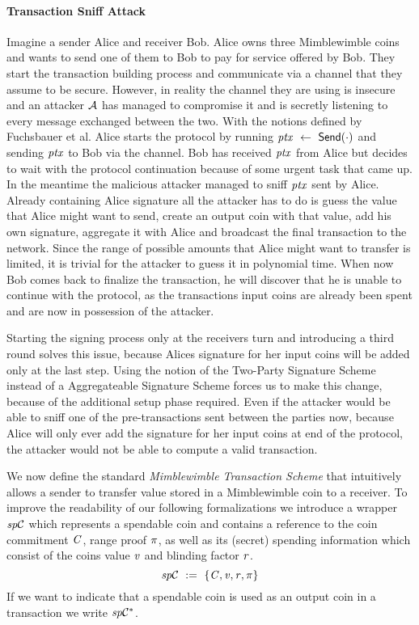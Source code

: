 \paragraph{Transaction Sniff Attack}
Imagine a sender Alice and receiver Bob.
Alice owns three Mimblewimble coins and wants to send one of them to Bob to pay for service offered by Bob.
They start the transaction building process and communicate via a channel that they assume to be secure.
However, in reality the channel they are using is insecure and an attacker $\mathcal{A}$ has managed to compromise it and is secretly listening to every message exchanged between the two.
With the notions defined by Fuchsbauer et al. Alice starts the protocol by running $\mathit{ptx} ~\leftarrow~ \mathsf{Send}(\cdot)$ and sending $\mathit{ptx}$ to Bob via the channel.
Bob has received $\mathit{ptx}$ from Alice but decides to wait with the protocol continuation because of some urgent task that came up.
In the meantime the malicious attacker managed to sniff $\mathit{ptx}$ sent by Alice.
Already containing Alice signature all the attacker has to do is guess the value that Alice might want to send, create an output coin with that value, add his own signature, aggregate it with Alice and broadcast the final transaction to the network.
Since the range of possible amounts that Alice might want to transfer is limited, it is trivial for the attacker to guess it in polynomial time.
When now Bob comes back to finalize the transaction, he will discover that he is unable to continue with the protocol, as the transactions input coins are already been spent and are now in possession of the attacker.

Starting the signing process only at the receivers turn and introducing a third round solves this issue, because Alices signature for her input coins will be added only at the last step.
Using the notion of the Two-Party Signature Scheme instead of a Aggregateable Signature Scheme forces us to make this change, because of the additional setup phase required.
Even if the attacker would be able to sniff one of the pre-transactions sent between the parties now, because Alice will only ever add the signature for her input coins at end of the protocol, the attacker would not be able to compute a valid transaction.

We now define the standard \emph{Mimblewimble Transaction Scheme} that intuitively allows a sender to transfer value stored in a Mimblewimble coin to a receiver.
To improve the readability of our following formalizations we introduce a wrapper $\mathit{sp}\mathcal{C}$ which represents a spendable coin and contains a reference to the coin commitment $\mathit{C}$, range proof $\pi$, as well as its (secret) spending information which consist of the coins value $\mathit{v}$ and blinding factor $\mathit{r}$.
\[ \mathit{sp}\mathcal{C} ~:=~ \{ \mathit{C}, \mathit{v}, \mathit{r}, \pi \} \]
If we want to indicate that a spendable coin is used as an output coin in a transaction we write $\mathit{sp}\mathcal{C}^*$.

